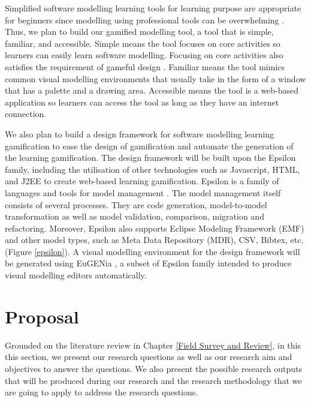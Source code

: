 \documentclass[12pt, a4paper]{report}
\begin{document}
{Simplified software modelling learning tools for learning purpose are appropriate for beginners since modelling using professional tools can be overwhelming \cite{dranidis2015learning, Akayama2013}. Thus, we plan to build our gamified modelling tool, a tool that is simple, familiar, and accessible. Simple means the tool focuses on core activities so learners can easily learn software modelling. Focusing on core activities also satisﬁes the requirement of gameful design \cite{deterding2015lens}. Familiar means the tool mimics common visual modelling environments that usually take in the form of a window that has a palette and a drawing area. Accessible means the tool is a web-based application so learners can access the tool as long as they have an internet connection.

We also plan to build a design framework for software modelling learning gamification to ease the design of gamiﬁcation and automate the generation of the learning gamification. The design framework will be built upon the Epsilon family, including the utilisation of other technologies such as Javascript, HTML, and J2EE to create web-based learning gamification. Epsilon is a family of languages and tools for model management \cite{kolovos2010epsilon}. The model management itself consists of several processes. They are code generation, model-to-model transformation as well as model validation, comparison, migration and refactoring. Moreover, Epsilon also supports Eclipse Modeling Framework (EMF) and other model types, such as Meta Data Repository (MDR), CSV, Bibtex, etc. (Figure \ref{epsilon}). A visual modelling environment for the design framework will be generated using EuGENia \cite{kolovos2015eugenia}, a subset of Epsilon family intended to produce visual modelling editors automatically.

\chapter{Proposal}
\label{Proposal}
Grounded on the literature review in Chapter \ref{Field Survey and Review}, in this this section, we present our research questions as well as our research aim and objectives to answer the questions. We also present the possible research outputs that will be produced during our research and the research methodology that we are going to apply to address the research questions.   

}
\end{document}
